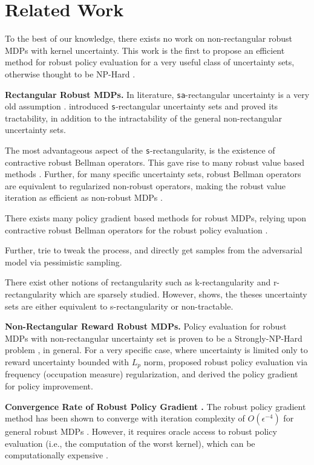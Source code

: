 \section{Related Work}
To the best of our knowledge, there exists no work on non-rectangular robust MDPs with kernel uncertainty. This work is the first to propose an efficient method for robust policy evaluation for a very useful class of uncertainty sets, otherwise thought to be NP-Hard \cite{RVI}.

\textbf{Rectangular Robust MDPs.} In literature, \texttt{sa}-rectangular uncertainty is a very old assumption \cite{Iyenger2005,Nilim2005RobustCO}. \cite{RVI} introduced \texttt{s}-rectangular uncertainty sets and proved its tractability, in addition to the intractability of the general non-rectangular uncertainty sets. 

The most advantageous aspect of the \texttt{s}-rectangularity, is the existence of contractive robust Bellman operators. This gave rise to many robust value based methods \cite{ppi,RPG_conv}. Further, for many specific uncertainty sets, robust Bellman operators are equivalent to regularized non-robust operators, making the robust value iteration as efficient as non-robust MDPs \cite{derman2021twice, Rcontamination, LpRMDP}.  

There exists many policy gradient based methods for robust MDPs, relying upon contractive robust Bellman operators for the robust policy evaluation \cite{PG_RContamination, LpPgRMDP}.

Further, \cite{Ewok_dileep,Ewok} trie to tweak the process, and directly get samples from the adversarial model via pessimistic sampling. 


There exist other notions of rectangularity such as k-rectangularity \cite{k-rectangularRMDP} and r-rectangularity \cite{r-rectRMDP} which are sparsely studied. However, \cite{TractablerRMDP} shows, the theses uncertainty sets are either equivalent to s-rectangularity or non-tractable.

\textbf{Non-Rectangular Reward Robust MDPs. } 
Policy evaluation for robust MDPs with non-rectangular uncertainty set is proven to be a Strongly-NP-Hard problem \cite{RVI}, in general. For a very specific case, where uncertainty is limited only to reward uncertainty bounded with $L_p$ norm, \cite{LpRewardRobust} proposed robust policy evaluation via frequency (occupation measure) regularization, and derived the policy gradient for policy improvement. 

\textbf{Convergence Rate of Robust Policy Gradient .} The robust policy gradient method has been shown to converge with iteration complexity of \(O(\epsilon^{-4})\) for general robust MDPs \cite{RPG_conv}. However, it requires oracle access to robust policy evaluation (i.e., the computation of the worst kernel), which can be computationally expensive \cite{RPG_conv}.
